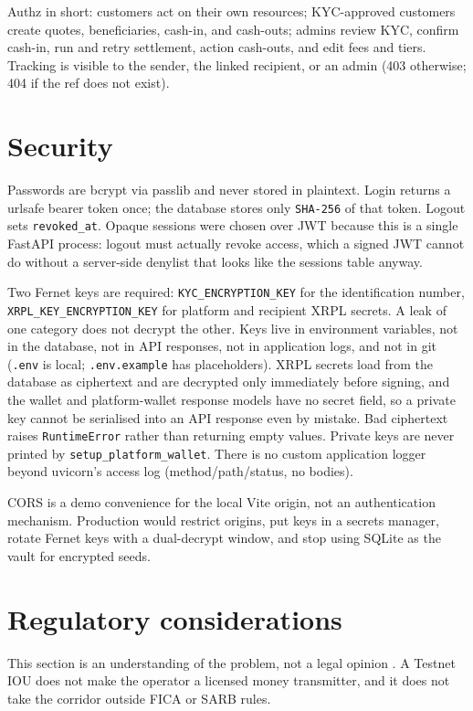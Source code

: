 \documentclass[11pt]{article}
\begin{document}
Authz in short: customers act on their own resources; KYC-approved customers create quotes, beneficiaries, cash-in, and cash-outs; admins review KYC, confirm cash-in, run and retry settlement, action cash-outs, and edit fees and tiers. Tracking is visible to the sender, the linked recipient, or an admin (403 otherwise; 404 if the ref does not exist).

\section{Security}
Passwords are bcrypt via passlib and never stored in plaintext. Login returns a urlsafe bearer token once; the database stores only \texttt{SHA-256} of that token. Logout sets \texttt{revoked\_at}. Opaque sessions were chosen over JWT because this is a single FastAPI process: logout must actually revoke access, which a signed JWT cannot do without a server-side denylist that looks like the sessions table anyway.

Two Fernet keys are required: \texttt{KYC\_ENCRYPTION\_KEY} for the identification number, \texttt{XRPL\_KEY\_ENCRYPTION\_KEY} for platform and recipient XRPL secrets. A leak of one category does not decrypt the other. Keys live in environment variables, not in the database, not in API responses, not in application logs, and not in git (\texttt{.env} is local; \texttt{.env.example} has placeholders). XRPL secrets load from the database as ciphertext and are decrypted only immediately before signing, and the wallet and platform-wallet response models have no secret field, so a private key cannot be serialised into an API response even by mistake. Bad ciphertext raises \texttt{RuntimeError} rather than returning empty values. Private keys are never printed by \texttt{setup\_platform\_wallet}. There is no custom application logger beyond uvicorn's access log (method/path/status, no bodies).

CORS is a demo convenience for the local Vite origin, not an authentication mechanism. Production would restrict origins, put keys in a secrets manager, rotate Fernet keys with a dual-decrypt window, and stop using SQLite as the vault for encrypted seeds.

\newpage
\section{Regulatory considerations}
This section is an understanding of the problem, not a legal opinion \citep{UCTBrief2026}. A Testnet IOU does not make the operator a licensed money transmitter, and it does not take the corridor outside FICA or SARB rules.
\end{document}
